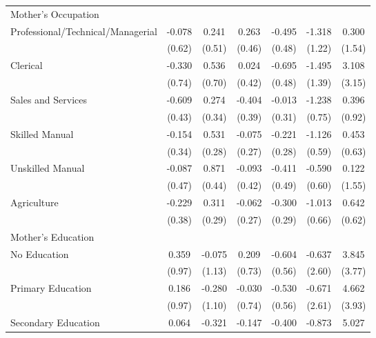 \begin{longtable}{l*{6}{c}}
\multicolumn{7}{l}{Mother's Occupation} \\
\hspace{1em}Professional/Technical/Managerial & -0.078 & 0.241 & 0.263 & -0.495 & -1.318 & 0.300 \\
                    & (0.62) & (0.51) & (0.46) & (0.48) & (1.22) & (1.54) \\
\hspace{1em}Clerical & -0.330 & 0.536 & 0.024 & -0.695 & -1.495 & 3.108 \\
                    & (0.74) & (0.70) & (0.42) & (0.48) & (1.39) & (3.15) \\
\hspace{1em}Sales and Services & -0.609 & 0.274 & -0.404 & -0.013 & -1.238 & 0.396 \\
                    & (0.43) & (0.34) & (0.39) & (0.31) & (0.75) & (0.92) \\
\hspace{1em}Skilled Manual & -0.154 & 0.531\sym{*} & -0.075 & -0.221 & -1.126\sym{*} & 0.453 \\
                    & (0.34) & (0.28) & (0.27) & (0.28) & (0.59) & (0.63) \\
\hspace{1em}Unskilled Manual & -0.087 & 0.871\sym{**} & -0.093 & -0.411 & -0.590 & 0.122 \\
                    & (0.47) & (0.44) & (0.42) & (0.49) & (0.60) & (1.55) \\
\hspace{1em}Agriculture & -0.229 & 0.311 & -0.062 & -0.300 & -1.013 & 0.642 \\
                    & (0.38) & (0.29) & (0.27) & (0.29) & (0.66) & (0.62) \\
\multicolumn{7}{l}{Mother's Education} \\
\hspace{1em}No Education & 0.359 & -0.075 & 0.209 & -0.604 & -0.637 & 3.845 \\
                    & (0.97) & (1.13) & (0.73) & (0.56) & (2.60) & (3.77) \\
\hspace{1em}Primary Education & 0.186 & -0.280 & -0.030 & -0.530 & -0.671 & 4.662 \\
                    & (0.97) & (1.10) & (0.74) & (0.56) & (2.61) & (3.93) \\
\hspace{1em}Secondary Education & 0.064 & -0.321 & -0.147 & -0.400 & -0.873 & 5.027 \\

\end{longtable}
